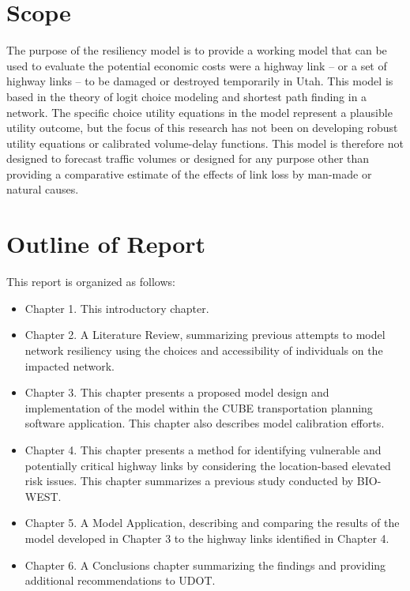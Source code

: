 \section{Scope}
The purpose of the resiliency model is to provide a working model that can be used to evaluate
the potential economic costs were a highway link – or a set of highway links – to be damaged or
destroyed temporarily in Utah. This model is based in the theory of logit choice modeling and
shortest path finding in a network. The specific choice utility equations in the model represent
a plausible utility outcome, but the focus of this research has not been on developing robust
utility equations or calibrated volume-delay functions. This model is therefore not designed to
forecast traffic volumes or designed for any purpose other than providing a comparative estimate
of the effects of link loss by man-made or natural causes.

\section{Outline of Report}

This report is organized as follows:

\begin{itemize}
	\item Chapter 1.	This introductory chapter.
	\item Chapter 2.	A Literature Review, summarizing previous attempts to model network resiliency using the choices and accessibility of individuals on the impacted network.
	\item Chapter 3.	This chapter presents a proposed model design and implementation of the model within the CUBE transportation planning software application. This chapter also describes model calibration efforts.
	\item Chapter 4.	This chapter presents a method for identifying vulnerable and potentially critical highway links by considering the location-based elevated risk issues. This chapter summarizes a previous study conducted by BIO-WEST.
	\item Chapter 5.	A Model Application, describing and comparing the results of the model developed in Chapter 3 to the highway links identified in Chapter 4.
	\item Chapter 6.	A Conclusions chapter summarizing the findings and providing additional recommendations to UDOT.
\end{itemize}
